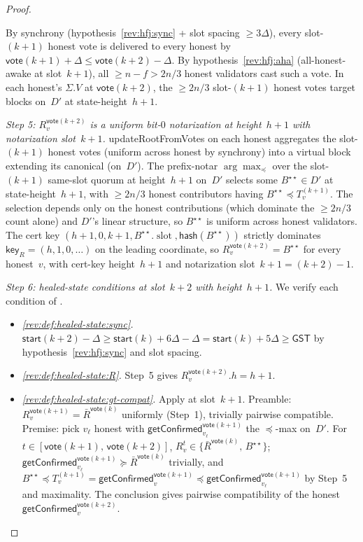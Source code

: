 \ifx\litemode\undefined\documentclass{article}\fi
\newcommand{\slot}[0]{\ensuremath{\operatorname{\mathrm{slot}}}}
\newcommand{\hash}{\mathsf{hash}}
\newcommand{\key}{\mathsf{key}}
\newcommand{\start}{\mathsf{start}}
\newcommand{\vote}{\mathsf{vote}}
\newcommand{\comm}[1]{\bar{#1}}
\newcommand{\updateRootFromVotes}{\textsf{updateRootFromVotes}\xspace}
\newcommand{\getConfirmed}{\textsf{getConfirmed}\xspace}
\theoremstyle{plain}
\theoremstyle{definition}
\theoremstyle{remark}
\newcommand{\GST}{\ensuremath{\mathsf{GST}}}
\newcommand{\AHA}{all-honest-awake\xspace}
\begin{document}
\begin{proof}
\begin{description}
By synchrony (hypothesis~\ref{rev:hfj:sync} + slot spacing $\geq 3\Delta$), every slot-$(k+1)$ honest vote is delivered to every honest by $\vote(k+1) + \Delta \leq \vote(k+2) - \Delta$. By hypothesis~\ref{rev:hfj:aha} (\AHA at slot~$k+1$), all $\geq n - f > 2n/3$ honest validators cast such a vote. In each honest's $\Sigma.V$ at $\vote(k+2)$, the $\geq 2n/3$ slot-$(k+1)$ honest votes target blocks on~$D'$ at state-height~$h+1$.

\emph{Step 5: $R_v^{\vote(k+2)}$ is a uniform bit-$0$ notarization at height~$h+1$ with notarization slot~$k+1$.}
\updateRootFromVotes{} on each honest aggregates the slot-$(k+1)$ honest votes (uniform across honest by synchrony) into a virtual block extending its canonical (on~$D'$). The prefix-notar $\arg\max_\preceq$ over the slot-$(k+1)$ same-slot quorum at height~$h+1$ on~$D'$ selects some $B^{\star\star} \in D'$ at state-height~$h+1$, with $\geq 2n/3$ honest contributors having $B^{\star\star} \preceq T_v^{(k+1)}$. The selection depends only on the honest contributions (which dominate the $\geq 2n/3$ count alone) and $D'$'s linear structure, so $B^{\star\star}$ is uniform across honest validators. The cert key $(h+1, 0, k+1, B^{\star\star}.\slot, \hash(B^{\star\star}))$ strictly dominates $\key_R = (h, 1, 0, \ldots)$ on the leading coordinate, so $R_v^{\vote(k+2)} = B^{\star\star}$ for every honest~$v$, with cert-key height~$h+1$ and notarization slot~$k+1 = (k+2) - 1$.

\emph{Step 6: healed-state conditions at slot~$k+2$ with height~$h+1$.}
We verify each condition of .
\begin{itemize}
  \item \emph{\ref{rev:def:healed-state:sync}.}
  $\start(k+2) - \Delta \geq \start(k) + 6\Delta - \Delta = \start(k) + 5\Delta \geq \GST$ by hypothesis~\ref{rev:hfj:sync} and slot spacing.

  \item \emph{\ref{rev:def:healed-state:R}.}
  Step~5 gives $R_v^{\vote(k+2)}.h = h+1$.

  \item \emph{\ref{rev:def:healed-state:gt-compat}.}
  Apply  at slot~$k+1$. Preamble: $R_v^{\vote(k+1)} = \comm{R}^{\vote(k)}$ uniformly (Step~1), trivially pairwise compatible. Premise: pick $v_\ell$ honest with $\getConfirmed_{v_\ell}^{\vote(k+1)}$ the $\preceq$-max on~$D'$. For $t \in [\vote(k+1),\, \vote(k+2)]$, $R_v^t \in \{\comm{R}^{\vote(k)},\, B^{\star\star}\}$; $\getConfirmed_{v_\ell}^{\vote(k+1)} \succeq \comm{R}^{\vote(k)}$ trivially, and $B^{\star\star} \preceq T_v^{(k+1)} = \getConfirmed_v^{\vote(k+1)} \preceq \getConfirmed_{v_\ell}^{\vote(k+1)}$ by Step~5 and maximality. The conclusion gives pairwise compatibility of the honest $\getConfirmed_v^{\vote(k+2)}$.


\end{itemize}
\end{description}
\end{proof}
\end{document}
